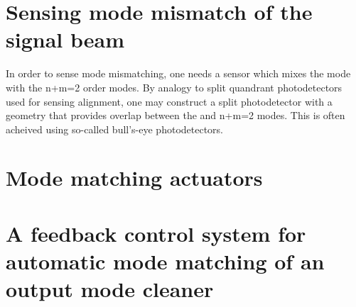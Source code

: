 
\section{Sensing mode mismatch of the signal beam}
In order to sense mode mismatching, one needs a sensor which mixes the  mode with the n+m=2 order modes. %
By analogy to split quandrant photodetectors used for sensing alignment, one may construct a split photodetector with a geometry that provides overlap between the  and n+m=2 modes. %
This is often acheived using so-called bull's-eye photodetectors.\cite{Mueller:00}


\section{Mode matching actuators}


\cite{Canuel:11}

\cite{Arain:10}

\section{A feedback control system for automatic mode matching of an output mode cleaner}
